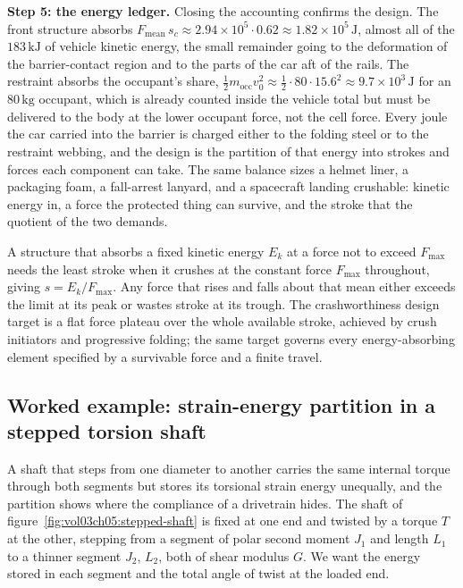 \textbf{Step 5: the energy ledger.} Closing the accounting confirms the
design. The front structure absorbs $F_\text{mean}\,s_c \approx 2.94\times
10^{5}\cdot 0.62 \approx 1.82\times 10^{5}\,\si{\joule}$, almost all
of the $183\,\si{\kilo\joule}$ of vehicle kinetic energy, the small
remainder going to the deformation of the barrier-contact region and to the
parts of the car aft of the rails. The restraint absorbs the occupant's
share, $\tfrac12 m_\text{occ} v_0^2 \approx \tfrac12\cdot 80\cdot 15.6^2
\approx 9.7\times 10^{3}\,\si{\joule}$ for an $80\,\si{\kilogram}$ occupant,
which is already counted inside the vehicle total but must be delivered to
the body at the lower occupant force, not the cell force. Every joule the
car carried into the barrier is charged either to the folding steel or to
the restraint webbing, and the design is the partition of that energy into
strokes and forces each component can take. The same balance sizes a
helmet liner, a packaging foam, a fall-arrest lanyard, and a spacecraft
landing crushable: kinetic energy in, a force the protected thing can
survive, and the stroke that the quotient of the two demands.

\begin{principle}
A structure that absorbs a fixed kinetic energy $E_k$ at a force not to
exceed $F_\text{max}$ needs the least stroke when it crushes at the
constant force $F_\text{max}$ throughout, giving $s = E_k/F_\text{max}$. Any
force that rises and falls about that mean either exceeds the limit at its
peak or wastes stroke at its trough. The crashworthiness design target is a
flat force plateau over the whole available stroke, achieved by crush
initiators and progressive folding; the same target governs every
energy-absorbing element specified by a survivable force and a finite
travel.
\end{principle}

\subsection{Worked example: strain-energy partition in a stepped torsion
shaft}

A shaft that steps from one diameter to another carries the same internal
torque through both segments but stores its torsional strain energy
unequally, and the partition shows where the compliance of a drivetrain
hides. The shaft of figure~\ref{fig:vol03ch05:stepped-shaft} is fixed at
one end and twisted by a torque $T$ at the other, stepping from a segment of
polar second moment $J_1$ and length $L_1$ to a thinner segment $J_2$,
$L_2$, both of shear modulus $G$. We want the energy stored in each segment
and the total angle of twist at the loaded end.

